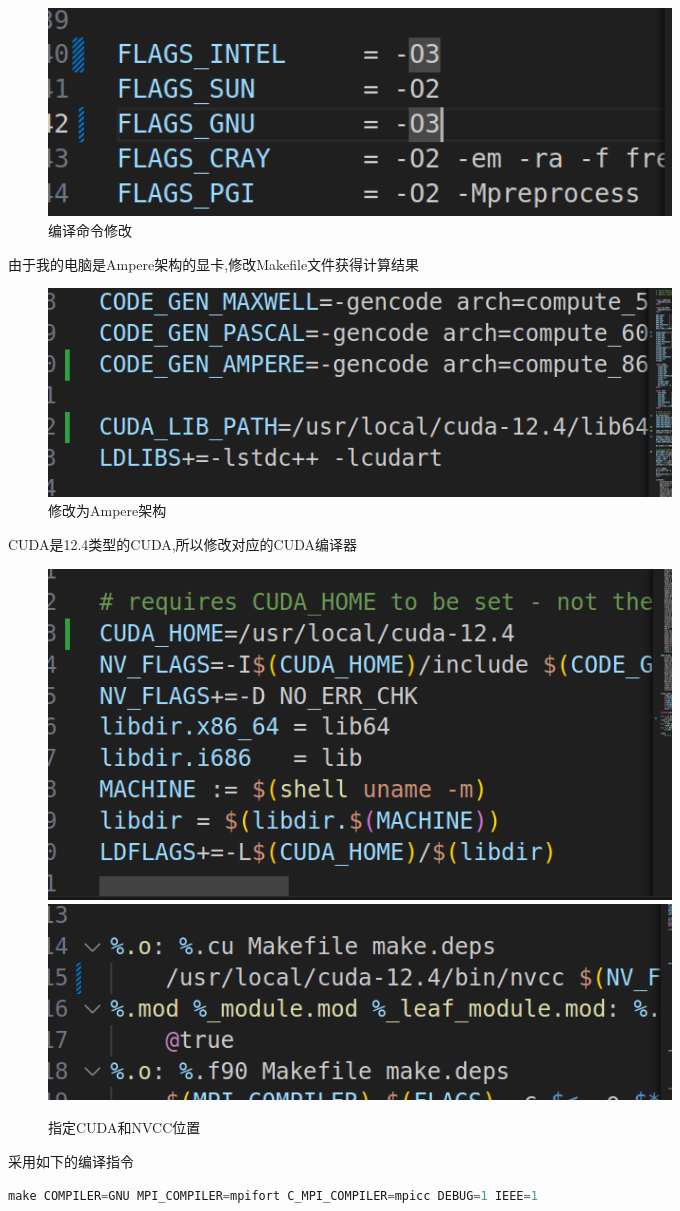 \documentclass{article}
\begin{document}
\begin{CJK}{UTF8}{gbsn}
\begin{figure}[H]
    \centering
    \includegraphics[width=0.8\textwidth]{./compile.png}
    \caption{编译命令修改}
\end{figure}
由于我的电脑是Ampere架构的显卡,修改Makefile文件获得计算结果
\begin{figure}[H]
    \centering
    \includegraphics[width=0.8\textwidth]{./compile2.png}
    \caption{修改为Ampere架构}
\end{figure}
CUDA是12.4类型的CUDA,所以修改对应的CUDA编译器
\begin{figure}[H]
    \centering
    \includegraphics[width=0.8\textwidth]{./com.png}
    \includegraphics[width=0.8\textwidth]{./compile4.png}
    \caption{指定CUDA和NVCC位置}
\end{figure}
采用如下的编译指令
\begin{lstlisting}[language=C++]
    make COMPILER=GNU MPI_COMPILER=mpifort C_MPI_COMPILER=mpicc DEBUG=1 IEEE=1

\end{lstlisting}
\end{CJK}
\end{document}
